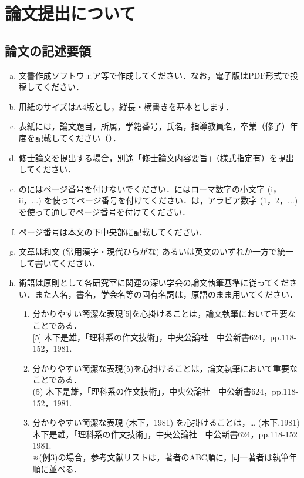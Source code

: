 \chapter{論文提出について}
    \section{論文の記述要領}
        \begin{enumerate}[a.]
            \item 文書作成ソフトウェア等で作成してください．なお，電子版はPDF形式で投稿してください．
            \item 用紙のサイズはA4版とし，縦長・横書きを基本とします．
            \item 表紙には，論文題目，所属，学籍番号，氏名，指導教員名，卒業（修了）年度を記載してください（）．
            \item 修士論文を提出する場合，別途「修士論文内容要旨」（様式指定有）を提出してください．
            \item {} のにはページ番号を付けないでください．にはローマ数字の小文字 (i，ii，...) を使ってページ番号を付けてください．は，アラビア数字 (1，2，...) を使って通しでページ番号を付けてください．
            \item ページ番号は本文の下中央部に記載してください．
            \item 文章は和文 (常用漢字・現代ひらがな) あるいは英文のいずれか一方で統一して書いてください．
            \item 術語は原則として各研究室に関連の深い学会の論文執筆基準に従ってください．また人名，書名，学会名等の固有名詞は，原語のまま用いてください．

                \begin{enumerate}[(例1)]
                    \item
                            分かりやすい簡潔な表現[5]を心掛けることは，論文執筆において重要なことである．\\
                            {[5]} 木下是雄，「理科系の作文技術」，中央公論社　中公新書624，pp.118-152，1981.
                    \item
                            分かりやすい簡潔な表現(5)を心掛けることは，論文執筆において重要なことである．\\
                            (5) 木下是雄，「理科系の作文技術」，中央公論社　中公新書624，pp.118-152，1981.
                    \item \label{例3}
                            分かりやすい簡潔な表現 (木下，1981) を心掛けることは，…
                            (木下,1981)  \\
                            木下是雄，「理科系の作文技術」，中央公論社　中公新書624，pp.118-152 1981.\\
                            ※(例3)の場合，参考文献リストは，著者のABC順に，同一著者は執筆年順に並べる．
                \end{enumerate}


\end{enumerate}
